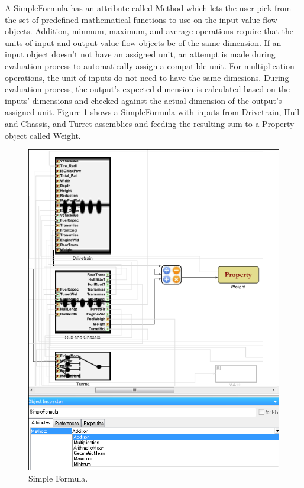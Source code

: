 A SimpleFormula has an attribute called Method which lets the user pick from the set of predefined mathematical functions to use on the input value flow objects. Addition, minmum, maximum, and average operations require that the units of input and output value flow objects be of the same dimension. If an input object doesn't not have an assigned unit, an attempt is made during evaluation process to automatically assign a compatible unit. For multiplication operations, the unit of inputs do not need to have the same dimesions. During evaluation process, the output's expected dimension is calculated based on the inputs' dimensions and checked against the actual dimension of the output's assigned unit. Figure \ref{fig:simpleformula} shows a SimpleFormula with inputs from Drivetrain, Hull and Chassis, and Turret assemblies and feeding the resulting sum to a Property object called Weight.
\begin{figure}[t]
\centering
\includegraphics[scale=0.40]{Figures/simpleFormula_VF.png}
\caption{Simple Formula.}
\label{fig:simpleformula}
\end{figure}


